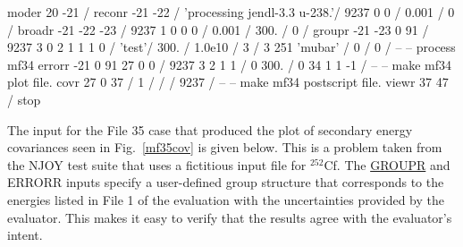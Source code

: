 \small
\begin{ccode}

   moder
    20 -21 /
   reconr
    -21 -22 /
    'processing jendl-3.3 u-238.'/
    9237 0 0 /
    0.001 /
    0 /
   broadr
    -21 -22 -23 /
    9237 1 0 0 0 /
    0.001 /
    300. /
    0 /
   groupr
    -21 -23 0 91 /
    9237 3 0 2 1 1 1 0 /
    'test'/
    300. /
    1.0e10 /
    3 /
    3 251 'mubar' /
    0 /
    0 /
   --
   -- process mf34
   errorr
    -21 0 91 27 0 0 /
    9237 3 2 1 1 /
    0 300. /
    0 34 1 1 -1 /
   --
   -- make mf34 plot file.
   covr
    27 0 37 /
    1 /
    /
    /
    9237 /
   --
   -- make mf34 postscript file.
   viewr
    37 47 /
   stop

\end{ccode}
\normalsize

The input for the File 35 case that produced the plot of secondary
energy covariances seen in Fig.~\ref{mf35cov} is given below.
This is a problem taken from the NJOY test suite that uses a
fictitious input file for $^{252}$Cf.  The
\hyperlink{sGROUPRhy}{GROUPR} and ERRORR
inputs specify a user-defined group structure that corresponds to
the energies listed in File 1 of the evaluation with the
uncertainties provided by the evaluator.  This makes it easy
to verify that the results agree with the evaluator's intent.


